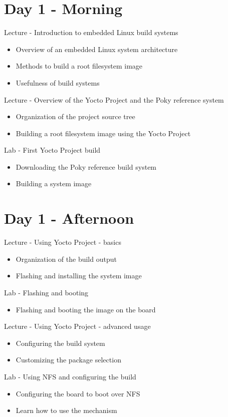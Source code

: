 \documentclass[a4paper,12pt,obeyspaces,spaces,hyphens]{article}
\begin{document}
\section{Day 1 - Morning}

\feagendaonecolumn
{Lecture - Introduction to embedded Linux build systems}
{
  \begin{itemize}
  \item Overview of an embedded Linux system architecture
  \item Methods to build a root filesystem image
  \item Usefulness of build systems
  \end{itemize}
}

\feagendatwocolumn
{Lecture - Overview of the Yocto Project and the Poky reference system}
{
  \begin{itemize}
  \item Organization of the project source tree
  \item Building a root filesystem image using the Yocto Project
  \end{itemize}
}
{Lab - First Yocto Project build}
{
  \begin{itemize}
  \item Downloading the Poky reference build system
  \item Building a system image
 \end{itemize}
}

\section{Day 1 - Afternoon}

\feagendatwocolumn
{Lecture - Using Yocto Project - basics}
{
  \begin{itemize}
  \item Organization of the build output
  \item Flashing and installing the system image
  \end{itemize}
}
{Lab - Flashing and booting}
{
  \begin{itemize}
  \item Flashing and booting the image on the board
  \end{itemize}
}

\feagendatwocolumn
{Lecture - Using Yocto Project - advanced usage}
{
  \begin{itemize}
  \item Configuring the build system
  \item Customizing the package selection
  \end{itemize}
}
{Lab - Using NFS and configuring the build}
{
  \begin{itemize}
  \item Configuring the board to boot over NFS
  \item Learn how to use the  mechanism
  \end{itemize}
}
\\
\end{document}
